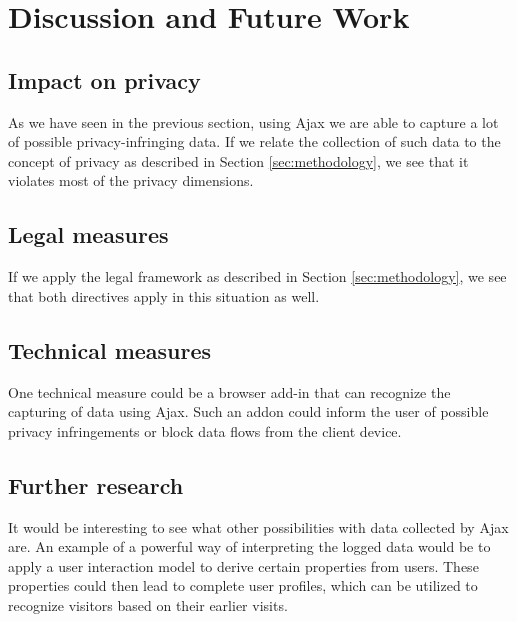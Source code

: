 \section{Discussion and Future Work}
\label{sec:discussion}

\subsection{Impact on privacy}
As we have seen in the previous section, using Ajax we are able to capture a lot of possible privacy-infringing data. If we relate the collection of such data to the concept of privacy as described in Section \ref{sec:methodology}, we see that it violates most of the privacy dimensions. 

\subsection{Legal measures}
If we apply the legal framework as described in Section \ref{sec:methodology}, we see that both directives apply in this situation as well. 

\subsection{Technical measures}
One technical measure could be a browser add-in that can recognize the capturing of data using Ajax. Such an addon could inform the user of possible privacy infringements or block data flows from the client device.

\subsection{Further research}
It would be interesting to see what other possibilities with data collected by Ajax are. An example of a powerful way of interpreting the logged data would be to apply a user interaction model to derive certain properties from users. These properties could then lead to complete user profiles, which can be utilized to recognize visitors based on their earlier visits.